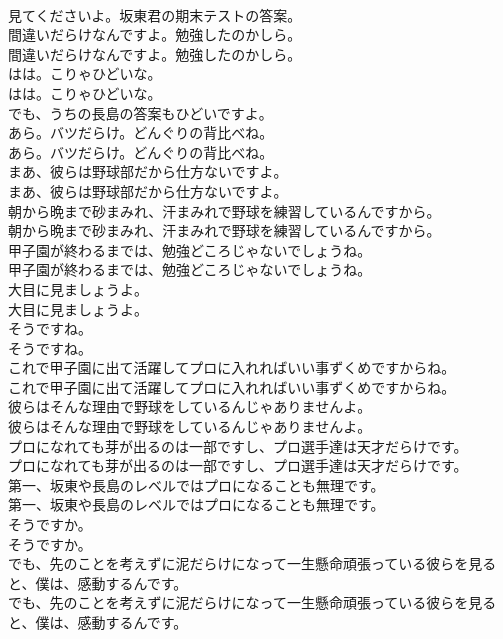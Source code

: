 \documentclass[8pt]{extreport}
\begin{document}
\begin{CJK}{UTF8}{min}
\\	見てくださいよ。坂東君の期末テストの答案。 
\\	間違いだらけなんですよ。勉強したのかしら。	
\\	間違いだらけなんですよ。勉強したのかしら。 
\\	はは。こりゃひどいな。	
\\	はは。こりゃひどいな。 
\\	でも、うちの長島の答案もひどいですよ。 
\\	あら。バツだらけ。どんぐりの背比べね。	
\\	あら。バツだらけ。どんぐりの背比べね。 
\\	まあ、彼らは野球部だから仕方ないですよ。	
\\	まあ、彼らは野球部だから仕方ないですよ。 
\\	朝から晩まで砂まみれ、汗まみれで野球を練習しているんですから。	
\\	朝から晩まで砂まみれ、汗まみれで野球を練習しているんですから。 
\\	甲子園が終わるまでは、勉強どころじゃないでしょうね。	
\\	甲子園が終わるまでは、勉強どころじゃないでしょうね。 
\\	大目に見ましょうよ。	
\\	大目に見ましょうよ。 
\\	そうですね。	
\\	そうですね。 
\\	これで甲子園に出て活躍してプロに入れればいい事ずくめですからね。	
\\	これで甲子園に出て活躍してプロに入れればいい事ずくめですからね。 
\\	彼らはそんな理由で野球をしているんじゃありませんよ。	
\\	彼らはそんな理由で野球をしているんじゃありませんよ。 
\\	プロになれても芽が出るのは一部ですし、プロ選手達は天才だらけです。	
\\	プロになれても芽が出るのは一部ですし、プロ選手達は天才だらけです。 
\\	第一、坂東や長島のレベルではプロになることも無理です。	
\\	第一、坂東や長島のレベルではプロになることも無理です。 
\\	そうですか。	
\\	そうですか。 
\\	でも、先のことを考えずに泥だらけになって一生懸命頑張っている彼らを見ると、僕は、感動するんです。	
\\	でも、先のことを考えずに泥だらけになって一生懸命頑張っている彼らを見ると、僕は、感動するんです。 

\end{CJK}
\end{document}
